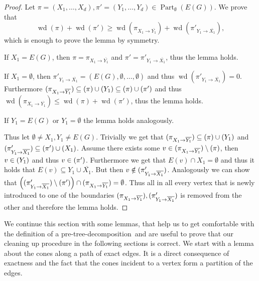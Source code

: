 \documentclass{lmcs}
\theoremstyle{plain}\newtheorem{claim}[thm]{Claim}   %
\DeclareMathOperator{\wid}{wd}
\DeclareMathOperator{\partitions}{Part}
\newcommand{\partitionsEmpty}{\ensuremath{\partitions_\emptyset}}
\newcommand{\ext}{\ensuremath{\rightarrow}}
\newcommand{\complementOf}[1]{\ensuremath{\overline{#1}}}
\let\boundary\relax
\newcommand{\boundary}{\Delta}
\newcommand{\preTreeDec}{pre-tree-decomposition}
\begin{document}
\begin{proof}
	Let $\pi=(X_1,\ldots,X_d),\pi'=(Y_1,\ldots,Y_d)\in\partitionsEmpty(E(G))$.
	We prove that \[\wid(\pi)+\wid(\pi')\geq \wid(\pi_{X_1\ext \complementOf{Y_1}})+\wid(\pi'_{Y_1\ext \complementOf{X_1}}),\] which is enough to prove the lemma by symmetry.
	
	If $X_1=E(G)$, then $\pi=\pi_{X_1\ext \complementOf{Y_1}}$ and $\pi'=\pi'_{Y_1\ext \complementOf{X_1}}$, thus the lemma holds.
	
	If $X_1=\emptyset$, then $\pi'_{Y_1\ext\complementOf{X_1}}=(E(G),\emptyset,\ldots,\emptyset)$ and thus $\wid(\pi'_{Y_1\ext\complementOf{X_1}})=0$.
	Furthermore $\boundary(\pi_{X_1 \ext \complementOf{Y_1}}) \subseteq \boundary(\pi) \cup \boundary(Y_1) \subseteq \boundary(\pi) \cup \boundary(\pi')$ and thus $\wid(\pi_{X_1 \ext \complementOf{Y_1}}) \leq \wid(\pi) + \wid(\pi')$, thus the lemma holds.
	
	If $Y_1=E(G)$ or $Y_1=\emptyset$ the lemma holds analogously.
	
	Thus let $\emptyset\neq X_1,Y_1\neq E(G)$.
	Trivially we get that $\boundary(\pi_{X_1 \ext \complementOf{Y_1}}) \subseteq \boundary(\pi) \cup \boundary(Y_1)$ and $\boundary(\pi'_{Y_1 \ext \complementOf{X_1}}) \subseteq \boundary(\pi') \cup \boundary(X_1)$.
	Assume there exists some $v\in \boundary(\pi_{X_1 \ext \complementOf{Y_1}})\setminus \boundary(\pi)$, then $v\in \boundary(Y_1)$ and thus $v\in \boundary(\pi')$.
	Furthermore we get that $E(v) \cap X_1=\emptyset$ and thus it holds that $E(v)\subseteq Y_1 \cup \complementOf{X_1}$.
	But then $v\notin \boundary(\pi'_{Y_1 \ext \complementOf{X_1}})$.
	Analogously we can show that $\left(\boundary(\pi'_{Y_1 \ext \complementOf{X_1}})\setminus \boundary(\pi')\right) \cap \boundary(\pi_{X_1 \ext \complementOf{Y_1}})=\emptyset$.
	Thus all in all every vertex that is newly introduced to one of the boundaries $\boundary(\pi_{X_1 \ext \complementOf{Y_1}}), \boundary(\pi'_{Y_1 \ext \complementOf{X_1}})$ is removed from the other and therefore the lemma holds.
\end{proof}


We continue this section with some lemmas, that help us to get comfortable with the definition of a \preTreeDec\ and are useful to prove that our cleaning up procedure in the following sections is correct.
We start with a lemma about the cones along a path of exact edges.
It is a direct consequence of exactness and the fact that the cones incident to a vertex form a partition of the edges.
\end{document}
